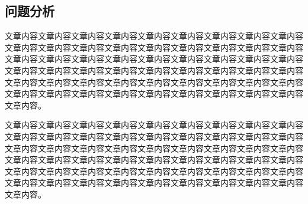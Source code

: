 \subsection{问题分析}

文章内容文章内容文章内容文章内容文章内容文章内容文章内容文章内容文章内容文章内容文章内容文章内容文章内容文章内容文章内容文章内容文章内容文章内容文章内容文章内容文章内容文章内容文章内容文章内容文章内容文章内容文章内容文章内容文章内容文章内容文章内容文章内容文章内容文章内容文章内容文章内容文章内容文章内容文章内容文章内容文章内容文章内容文章内容文章内容文章内容文章内容文章内容文章内容文章内容文章内容文章内容文章内容文章内容文章内容文章内容。

文章内容文章内容文章内容文章内容文章内容文章内容文章内容文章内容文章内容文章内容文章内容文章内容文章内容文章内容文章内容文章内容文章内容文章内容文章内容文章内容文章内容文章内容文章内容文章内容文章内容文章内容文章内容文章内容文章内容文章内容文章内容文章内容文章内容文章内容文章内容文章内容文章内容文章内容文章内容文章内容文章内容文章内容文章内容文章内容文章内容文章内容文章内容文章内容文章内容文章内容文章内容文章内容文章内容文章内容文章内容。
